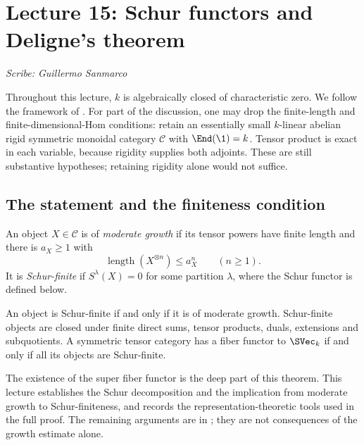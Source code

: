 \section{Lecture 15: Schur functors and Deligne's theorem}
\label{lec15}
\noindent\textit{Scribe: Guillermo Sanmarco}

Throughout this lecture, $k$ is algebraically closed of characteristic
zero. We follow the framework of \cite{Deligne2002}. For part of the
discussion, one may drop the finite-length and finite-dimensional-Hom
conditions: retain an essentially small $k$-linear abelian rigid symmetric
monoidal category $\mathcal C$ with $\End(\1)=k$. Tensor product is exact
in each variable, because rigidity supplies both adjoints. These are
still substantive hypotheses; retaining rigidity alone would not suffice.

\subsection{The statement and the finiteness condition}

\begin{definition}
An object $X\in\mathcal C$ is of \emph{moderate growth} if its tensor
powers have finite length and there is $a_X\geq1$ with
\[
 \operatorname{length}(X^{\otimes n})\leq a_X^n
       \qquad(n\geq1).
\]
It is \emph{Schur-finite} if $S^\lambda(X)=0$ for some partition
$\lambda$, where the Schur functor is defined below.
\end{definition}

\begin{theorem}[Deligne]
An object is Schur-finite if and only if it is of moderate growth.
Schur-finite objects are closed under finite direct sums, tensor products,
duals, extensions and subquotients. A symmetric tensor category has a
fiber functor to $\SVec_k$ if and only if all its objects are Schur-finite.
\end{theorem}

The existence of the super fiber functor is the deep part of this
theorem. This lecture establishes the Schur decomposition and the
implication from moderate growth to Schur-finiteness, and records the
representation-theoretic tools used in the full proof. The remaining
arguments are in \cite[Proposition 0.5 and Theorem 0.6]{Deligne2002};
they are not consequences of the growth estimate alone.

